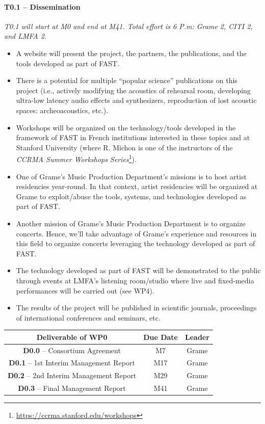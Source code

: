 \documentclass[a4paper,9pt]{extarticle}
\newcommand{\PP}{FAST}
\begin{document}
\paragraph{T0.1 -- Dissemination}

\textit{T0.1 will start at M0 and end at M41. Total effort is 6 P.m: Grame 2, CITI 2, and LMFA 2.}

\begin{itemize}
\setlength\itemsep{0em}
\item A website will present the project, the partners, the publications, and the tools developed as part of \PP{}.
\item There is a potential for multiple ``popular science'' publications on this project (i.e., actively modifying the acoustics of rehearsal room, developing ultra-low latency audio effects and synthesizers, reproduction of lost acoustic spaces: archeoacoustics, etc.). 
\item Workshops will be organized on the technology/tools developed in the framework of \PP{} in French institutions interested in these topics and at Stanford University (where R. Michon is one of the instructors of the \textit{CCRMA Summer Workshops Series}\footnote{\url{https://ccrma.stanford.edu/workshops}}).
\item One of Grame's Music Production Department's missions is to host artist residencies year-round. In that context, artist residencies will be organized at Grame to exploit/abuse the tools, systems, and technologies developed as part of \PP{}.
\item Another mission of Grame's Music Production Department is to organize concerts. Hence, we'll take advantage of Grame's experience and resources in this field to organize concerts leveraging the technology developed as part of \PP{}.
\item The technology developed as part of \PP{} will be demonstrated to the public through events at LMFA's listening room/studio where live and fixed-media performances will be carried out (see WP4). 
\item The results of the project will be published in scientific journals, proceedings of international conferences and seminars, etc.
\end{itemize}

\begin{center}
\begin{tabular}{c | c | c}
\textbf{Deliverable of WP0} & \textbf{Due Date} & \textbf{Leader}\\
\hline
\hline
\textbf{D0.0} -- Consortium Agreement & M7 & Grame\\
\hline
\textbf{D0.1} -- 1st Interim Management Report & M17 & Grame\\
\hline
\textbf{D0.2} -- 2nd Interim Management Report & M29 & Grame\\
\hline
\textbf{D0.3} -- Final Management Report & M41 & Grame
\end{tabular}
\end{center}
\end{document}
